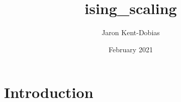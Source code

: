 \documentclass{article}
\title{ising_scaling}
\author{Jaron Kent-Dobias}
\date{February 2021}
\begin{document}
\maketitle

\section{Introduction}
\end{document}
